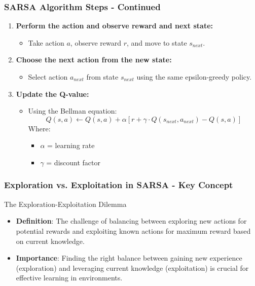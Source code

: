 \documentclass{beamer}
\begin{document}
\begin{frame}[fragile]
    \frametitle{SARSA Algorithm Steps - Continued}
    \begin{enumerate}[resume]
        \item \textbf{Perform the action and observe reward and next state:}
            \begin{itemize}
                \item Take action $a$, observe reward $r$, and move to state $s_{next}$.
            \end{itemize}
        \item \textbf{Choose the next action from the new state:}
            \begin{itemize}
                \item Select action $a_{next}$ from state $s_{next}$ using the same epsilon-greedy policy.
            \end{itemize}
        \item \textbf{Update the Q-value:}
            \begin{itemize}
                \item Using the Bellman equation:
                \begin{equation}
Q(s, a) \leftarrow Q(s, a) + \alpha \left[ r + \gamma \cdot Q(s_{next}, a_{next}) - Q(s, a) \right]
                \end{equation}
                Where:
                \begin{itemize}
                    \item $\alpha$ = learning rate
                    \item $\gamma$ = discount factor
                \end{itemize}
            \end{itemize}
    \end{enumerate}
\end{frame}

\begin{frame}[fragile]
    \frametitle{Exploration vs. Exploitation in SARSA - Key Concept}
    \begin{block}{The Exploration-Exploitation Dilemma}
        \begin{itemize}
            \item \textbf{Definition}: The challenge of balancing between exploring new actions for potential rewards and exploiting known actions for maximum reward based on current knowledge.
            \item \textbf{Importance}: Finding the right balance between gaining new experience (exploration) and leveraging current knowledge (exploitation) is crucial for effective learning in environments.
        \end{itemize}
    \end{block}
\end{frame}
\end{document}
